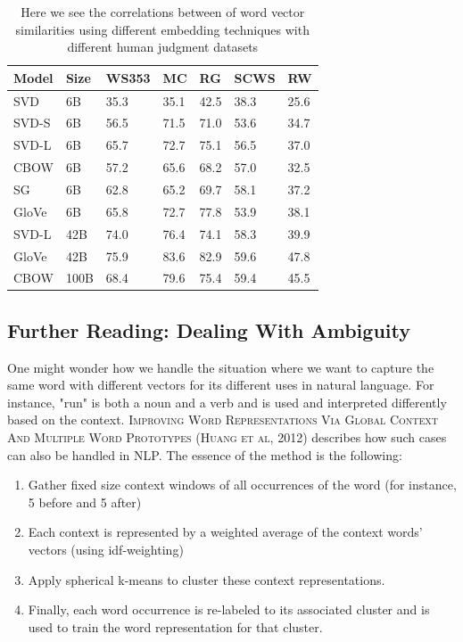 \documentclass{tufte-handout}
\begin{document}
\begin{table}[ht]
  \centering
  \selectfont
  \begin{tabular}{ll | lllll}
    \toprule
    Model & Size & WS353 & MC & RG & SCWS & RW \\
    \midrule    
    SVD & 6B & 35.3 & 35.1 & 42.5 & 38.3 & 25.6\\
    SVD-S & 6B & 56.5 & 71.5 & 71.0 & 53.6 & 34.7\\
    SVD-L & 6B & 65.7 & 72.7 & 75.1 & 56.5 & 37.0\\
    CBOW & 6B & 57.2 & 65.6 & 68.2 & 57.0 & 32.5\\
    SG & 6B & 62.8 & 65.2 & 69.7 & 58.1 & 37.2\\
    GloVe & 6B & 65.8 & 72.7 & 77.8 & 53.9 & 38.1\\
    \hline
    SVD-L & 42B & 74.0 & 76.4 & 74.1 & 58.3 & 39.9\\
    GloVe & 42B & 75.9 & 83.6 & 82.9 & 59.6 & 47.8\\
    \hline
    CBOW & 100B & 68.4 & 79.6 & 75.4 & 59.4 & 45.5\\
    \bottomrule
  \end{tabular}
  \caption{Here we see the correlations between of word vector similarities using different embedding techniques with different human judgment datasets}
  \label{tab:normaltab}
\end{table}

\subsection{Further Reading: Dealing With Ambiguity}
One might wonder how we handle the situation where we want to capture the same word with different vectors for its different uses in natural language. For instance, "run" is both a noun and a verb and is used and interpreted differently based on the context. \textsc{Improving Word Representations Via Global Context And Multiple Word Prototypes (Huang et al, 2012)} describes how such cases can also be handled in NLP. The essence of the method is the following:

\begin{enumerate}
\item Gather fixed size context windows of all occurrences of the word (for instance, 5 before and 5 after)
\item Each context is represented by a weighted average of the context words' vectors (using idf-weighting)
\item Apply spherical k-means to cluster these context representations.
\item Finally, each word occurrence is re-labeled to its associated cluster and is used to train the word representation for that cluster.
\end{enumerate}
\end{document}
